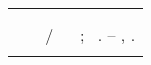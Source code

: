 %
\begin{fichacatalografica}
	\hspace{-1.4cm}
	\imprimirnotaautorizacao \\ \\
	\vspace*{\fill}					%
\begin{center}					%
  \imprimirnotabib \\
  \begin{table}[htb]
	\scriptsize
	\centering	
	\begin{tabular}{|p{0.9cm} p{8.7cm}|}
		\hline
	      & \\
		  &	  \imprimirautorficha     \\
		
		 \imprimircutter & 
							\hspace{0.4cm}\imprimirtitulo~  / ~\imprimirautor~ ;  ~\imprimirorientadorcorpoficha. -- 	\imprimirlocal, \imprimirdata.   \\
		
		  &  %
		

\end{tabular}
\end{table}
\end{center}
\end{fichacatalografica}

